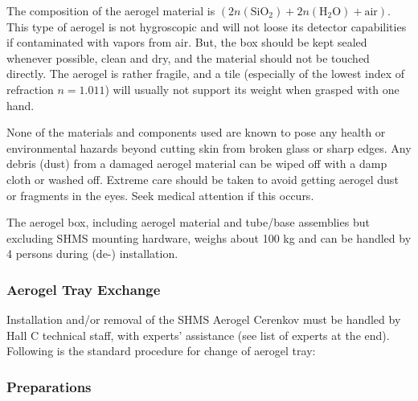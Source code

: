 The composition of the aerogel material is
$(2n(\textrm{SiO}_2)+2n(\textrm{H}_2 \textrm{O})+\textrm{air})$. This type of aerogel is not hygroscopic and
will not loose its detector capabilities if contaminated with vapors
from air. But, the box should be kept sealed whenever possible, clean
and dry, and the material should not be touched directly. The aerogel
is rather fragile, and a tile (especially of the lowest index of
refraction $n=1.011$) will usually not support its weight when grasped
with one hand.

None of the materials and components used are known to pose any health
or environmental hazards beyond cutting skin from broken glass or
sharp edges. Any debris (dust) from a damaged aerogel material can be
wiped off with a damp cloth or washed off. Extreme care should be
taken to avoid getting aerogel dust or fragments in the eyes. Seek
medical attention if this occurs.

The aerogel box, including aerogel material and tube/base assemblies
but excluding SHMS mounting hardware, weighs about 100 kg and can be
handled by 4 persons during (de-) installation.

\subsubsection{Aerogel Tray Exchange}
Installation and/or removal of the SHMS Aerogel Cerenkov must be
handled by Hall C technical staff, with experts’ assistance (see
list of experts at the end). Following is the standard procedure for
change of aerogel tray:

\subsubsection*{Preparations}

